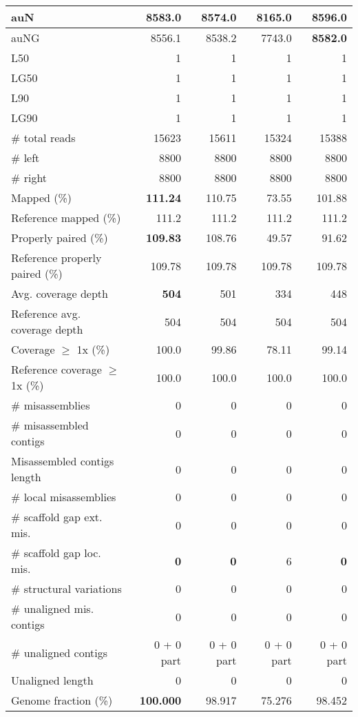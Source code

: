 \documentclass[12pt,a4paper]{article}
\begin{document}
\begin{table}[ht]
\begin{center}
\begin{tabular}{|l*{4}{|r}|}
auN & 8583.0 & 8574.0 & 8165.0 & {\bf 8596.0} \\ \hline
auNG & 8556.1 & 8538.2 & 7743.0 & {\bf 8582.0} \\ \hline
L50 & 1 & 1 & 1 & 1 \\ \hline
LG50 & 1 & 1 & 1 & 1 \\ \hline
L90 & 1 & 1 & 1 & 1 \\ \hline
LG90 & 1 & 1 & 1 & 1 \\ \hline
\# total reads & 15623 & 15611 & 15324 & 15388 \\ \hline
\# left & 8800 & 8800 & 8800 & 8800 \\ \hline
\# right & 8800 & 8800 & 8800 & 8800 \\ \hline
Mapped (\%) & {\bf 111.24} & 110.75 & 73.55 & 101.88 \\ \hline
Reference mapped (\%) & 111.2 & 111.2 & 111.2 & 111.2 \\ \hline
Properly paired (\%) & {\bf 109.83} & 108.76 & 49.57 & 91.62 \\ \hline
Reference properly paired (\%) & 109.78 & 109.78 & 109.78 & 109.78 \\ \hline
Avg. coverage depth & {\bf 504} & 501 & 334 & 448 \\ \hline
Reference avg. coverage depth & 504 & 504 & 504 & 504 \\ \hline
Coverage $\geq$ 1x (\%) & 100.0 & 99.86 & 78.11 & 99.14 \\ \hline
Reference coverage $\geq$ 1x (\%) & 100.0 & 100.0 & 100.0 & 100.0 \\ \hline
\# misassemblies & 0 & 0 & 0 & 0 \\ \hline
\# misassembled contigs & 0 & 0 & 0 & 0 \\ \hline
Misassembled contigs length & 0 & 0 & 0 & 0 \\ \hline
\# local misassemblies & 0 & 0 & 0 & 0 \\ \hline
\# scaffold gap ext. mis. & 0 & 0 & 0 & 0 \\ \hline
\# scaffold gap loc. mis. & {\bf 0} & {\bf 0} & 6 & {\bf 0} \\ \hline
\# structural variations & 0 & 0 & 0 & 0 \\ \hline
\# unaligned mis. contigs & 0 & 0 & 0 & 0 \\ \hline
\# unaligned contigs & 0 + 0 part & 0 + 0 part & 0 + 0 part & 0 + 0 part \\ \hline
Unaligned length & 0 & 0 & 0 & 0 \\ \hline
Genome fraction (\%) & {\bf 100.000} & 98.917 & 75.276 & 98.452 \\ \hline

\end{tabular}
\end{center}
\end{table}
\end{document}

